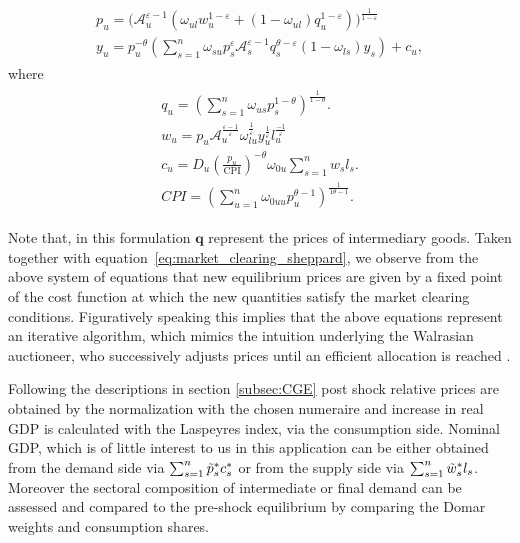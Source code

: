 \begin{gather}
\begin{split}    
  p_u = \biggl( \mathcal A_u^{\varepsilon - 1} \left( \omega_{ul} w_u ^ {1 - \varepsilon} + (1 - \omega_{ul})  q_u ^ {1 - \varepsilon} \right) \biggr) ^ {\frac{1}{1 - \varepsilon}} \\
  y_u = p_u^{-\theta} \left(\sum_{s=1}^n \omega_{su}  p_s ^ {\varepsilon}  \mathcal A_s ^ {\varepsilon - 1} q_s ^ {\theta - \varepsilon}  (1 - \omega_{ls} )  y_s \right) +  c_u,
  \end{split}
\end{gather}
where 
\begin{gather}
\begin{split}
  q_u = \left( \sum_{s=1}^n \omega_{us}  p_s ^ {1 - \theta} \right) ^ {\frac{1}{1 - \theta}}. \\
  w_u = p_u \mathcal A_u ^ {\frac {\varepsilon - 1}{\varepsilon}} \omega_{lu} ^ {\frac{1}{\varepsilon}} y_u ^ {\frac{1}{\varepsilon}} l_u ^ {\frac {-1}{\varepsilon}} \\
  c_u = D_u \left( \frac{p_u}{\text{CPI}} \right)^ {-\theta} \omega_{0u} \sum_{s=1}^n w_s l_s. \\ CPI = \left( \sum_{u=1}^n \omega_{0uu} p_u^{\theta  -1} \right)^{\frac{1}{1\theta - 1}}.
  \end{split}
\end{gather}

Note that, in this formulation $\mathbf{q}$ represent the prices of intermediary goods. Taken together with equation~\eqref{eq:market_clearing_sheppard}, we observe from the above system of equations that new equilibrium prices are given by a fixed point of the cost function at which the new quantities satisfy the market clearing conditions. Figuratively speaking this implies that the above equations represent an iterative algorithm, which mimics the intuition underlying the Walrasian auctioneer, who successively adjusts prices until an efficient allocation is reached \citep{cardeneteAppliedGeneralEquilibrium2017}.

Following the descriptions in section \ref{subsec:CGE} post shock relative prices are obtained by the normalization with the chosen numeraire and increase in real GDP is calculated with the Laspeyres index, via the consumption side.  Nominal GDP, which is of little interest to us in this application can be either obtained from the demand side via $\sum_{s = 1}^n \tilde p_s ^*c^*_s$ or from the supply side via $\sum_{s = 1}^n \tilde w_s ^* l_s$. Moreover the sectoral composition of intermediate or final demand can be assessed and compared to the pre-shock equilibrium by comparing the Domar weights and consumption shares.


